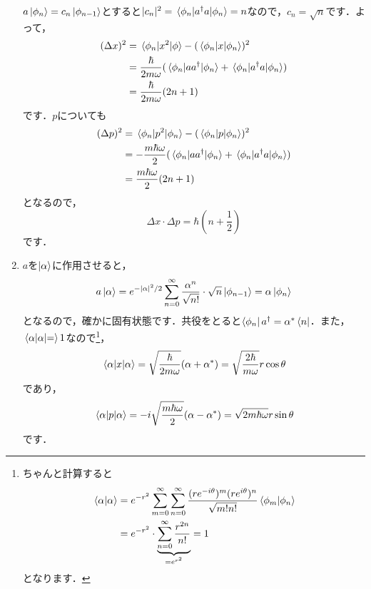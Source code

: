 \documentclass[a4paper,pdflatex,ja=standard]{bxjsarticle}
\begin{document}
\begin{enumerate}
  $a\ket{\phi_n}=c_n\ket{\phi_{n-1}}$とすると$|c_n|^2=\mel*{\phi_n}{a^{\dag}a}{\phi_n}=n$なので，$c_n=\sqrt{n}$です．よって，
  \begin{align}
    (\Delta x)^2
    &=
    \mel*{\phi_n}{x^2}{\phi}
    -
    (\mel*{\phi_n}{x}{\phi_n})^2
    \nonumber
    \\
    &=
    \frac{\hbar}{2m\omega}
    (\mel*{\phi_n}{aa^{\dag}}{\phi_n}+\mel*{\phi_n}{a^{\dag}a}{\phi_n})
    \nonumber
    \\
    &=
    \frac{\hbar}{2m\omega}(2n+1)
  \end{align}
  です．$p$についても
  \begin{align}
    (\Delta p)^2
    &=
    \mel*{\phi_n}{p^2}{\phi_n}
    -
    (\mel*{\phi_n}{p}{\phi_n})^2
    \nonumber
    \\
    &=    
    -\frac{m\hbar\omega}{2}
    (\mel*{\phi_n}{aa^{\dag}}{\phi_n}+\mel*{\phi_n}{a^{\dag}a}{\phi_n})
    \nonumber
    \\
    &=
    \frac{m\hbar\omega}{2}(2n+1)
  \end{align}
  となるので，
  \begin{equation}
    \Delta x\cdot\Delta p
    =
    \hbar
    \left( n+\frac{1}{2} \right)
  \end{equation}
  です．


  \item

  $a$を$\ket{\alpha}$に作用させると，
  \begin{equation}
    a\ket{\alpha}
    =
    e^{-|\alpha|^2/2}\sum_{n=0}^{\infty}\frac{\alpha^n}{\sqrt{n!}}\cdot\sqrt{n}\ket{\phi_{n-1}}
    =
    \alpha\ket{\phi_n}
  \end{equation}
  となるので，確かに固有状態です．共役をとると$\bra{\phi_n}a^{\dag}=\alpha^{\ast}\bra{n}$．また，$\mel*{\alpha}{\alpha}=1$なので\footnote{
    ちゃんと計算すると
    \begin{align*}
      \ev*{\alpha|\alpha}
      &=
      e^{-r^2}
      \sum_{m=0}^{\infty}\sum_{n=0}^{\infty}
      \frac{(re^{-i\theta})^m(re^{i\theta})^n}{\sqrt{m!n!}}\ev*{\phi_m|\phi_n}
      \\
      &=
      e^{-r^2}
      \cdot
      \underbrace{
        \sum_{n=0}^{\infty}\frac{r^{2n}}{n!}
      }_{=e^{r^2}}
      =
      1
    \end{align*}
    となります．
  }，
  \begin{equation}
    \mel*{\alpha}{x}{\alpha}
    =
    \sqrt{\frac{\hbar}{2m\omega}}(\alpha+\alpha^{\ast})
    =
    \sqrt{\frac{2\hbar}{m\omega}}r\cos\theta
  \end{equation}
  であり，
  \begin{equation}
    \ev*{\alpha|p|\alpha}
    =
    -i\sqrt{\frac{m\hbar\omega}{2}}(\alpha-\alpha^{\ast})
    =
    \sqrt{2m\hbar\omega}r\sin\theta
  \end{equation}
  です．



\end{enumerate}
\end{document}
